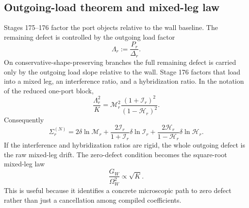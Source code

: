 \subsection{Outgoing-load theorem and mixed-leg law}
Stages 175--176 factor the port objects relative to the wall baseline.  The remaining defect is controlled by the outgoing load factor
\begin{equation}
\label{eq:app-part05-load-factor-Lambda}
\Lambda_r:=\frac{P_r}{\Delta_r}.
\end{equation}
On conservative-shape-preserving branches the full remaining defect is carried only by the outgoing load slope relative to the wall.  Stage 176 factors that load into a mixed leg, an interference ratio, and a hybridization ratio.  In the notation of the reduced one-port block,
\begin{equation}
\label{eq:app-part05-load-factor-factorization}
\frac{\Lambda_r^2}{K}
=
\mathcal M_r^2
\frac{(1+\mathcal I_r)^2}{(1-\mathcal H_r)^2}.
\end{equation}
Consequently
\begin{equation}
\label{eq:app-part05-SigmaN-factorized}
\Sigma_r^{(N)}
=
2\delta\ln\mathcal M_r
+
\frac{2\mathcal I_r}{1+\mathcal I_r}\delta\ln\mathcal I_r
+
\frac{2\mathcal H_r}{1-\mathcal H_r}\delta\ln\mathcal H_r.
\end{equation}
If the interference and hybridization ratios are rigid, the whole outgoing defect is the raw mixed-leg drift.  The zero-defect condition becomes the square-root mixed-leg law
\begin{equation}
\label{eq:app-part05-square-root-mixed-leg}
\frac{G_W}{\Omega_W^2}\propto\sqrt K.
\end{equation}
This is useful because it identifies a concrete microscopic path to zero defect rather than just a cancellation among compiled coefficients.

